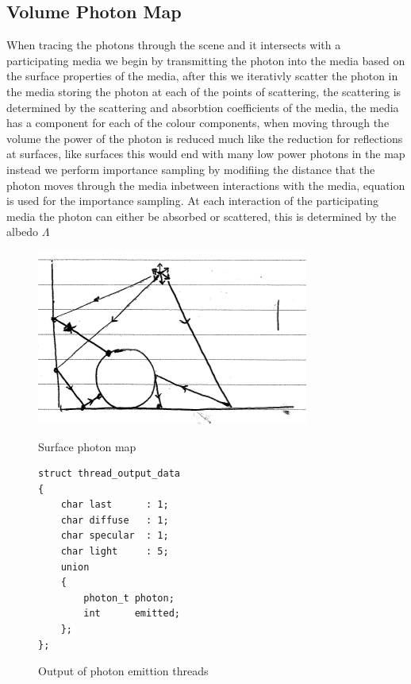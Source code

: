 \subsection{Volume Photon Map}
When tracing the photons through the scene and it intersects with a participating media we begin by transmitting the
photon into the media based on the surface properties of the media, after this we iterativly scatter the photon in the
media storing the photon at each of the points of scattering, the scattering is determined by the scattering and
absorbtion coefficients of the media, the media has a component for each of the colour components, when moving through
the volume the power of the photon is reduced much like the reduction for reflections at surfaces, like surfaces this
would end with many low power photons in the map instead we perform importance sampling by modifiing the distance that
the photon moves through the media inbetween interactions with the media, equation 
is used for the importance sampling. At each interaction of the participating media the photon can either be absorbed
or scattered, this is determined by the albedo $\Lambda$ 


\begin{figure}
\centering
\includegraphics{./images/photon_mapping.png}
\label{fig:surface_photon_map}
\caption{Surface photon map}
\end{figure}

\begin{figure}
\begin{lstlisting}
struct thread_output_data
{
	char last      : 1;
	char diffuse   : 1;
	char specular  : 1;
	char light     : 5;
	union
	{
		photon_t photon;
		int      emitted;
	};
};
\end{lstlisting}
\caption{Output of photon emittion threads}
\end{figure}

